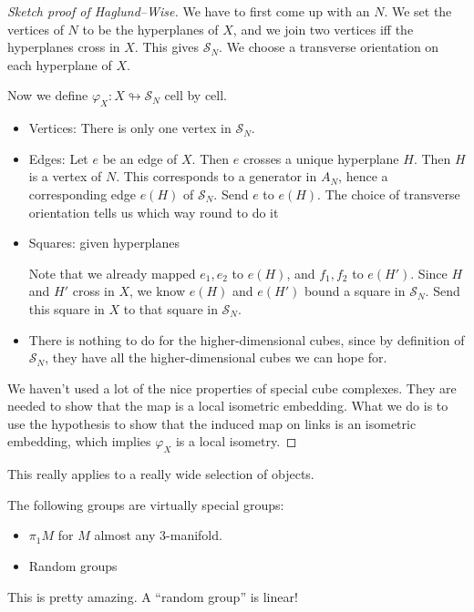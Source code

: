 \documentclass[a4paper]{article}
\begin{document}
\begin{proof}[Sketch proof of Haglund--Wise]
  We have to first come up with an $N$. We set the vertices of $N$ to be the hyperplanes of $X$, and we join two vertices iff the hyperplanes cross in $X$. This gives $\mathcal{S}_N$. We choose a transverse orientation on each hyperplane of $X$.

  Now we define $\varphi_X: X \looparrowright \mathcal{S}_N$ cell by cell.
  \begin{itemize}
    \item Vertices: There is only one vertex in $\mathcal{S}_N$.
    \item Edges: Let $e$ be an edge of $X$. Then $e$ crosses a unique hyperplane $H$. Then $H$ is a vertex of $N$. This corresponds to a generator in $A_N$, hence a corresponding edge $e(H)$ of $\mathcal{S}_N$. Send $e$ to $e(H)$. The choice of transverse orientation tells us which way round to do it
    \item Squares: given hyperplanes
      \begin{center}
      \end{center}
      Note that we already mapped $e_1, e_2$ to $e(H)$, and $f_1, f_2$ to $e(H')$. Since $H$ and $H'$ cross in $X$, we know $e(H)$ and $e(H')$ bound a square in $\mathcal{S}_N$. Send this square in $X$ to that square in $\mathcal{S}_N$.
    \item There is nothing to do for the higher-dimensional cubes, since by definition of $\mathcal{S}_N$, they have all the higher-dimensional cubes we can hope for.
  \end{itemize}
  We haven't used a lot of the nice properties of special cube complexes. They are needed to show that the map is a local isometric embedding. What we do is to use the hypothesis to show that the induced map on links is an isometric embedding, which implies $\varphi_X$ is a local isometry.
\end{proof}

This really applies to a really wide selection of objects.
\begin{eg}
  The following groups are virtually special groups:
  \begin{itemize}
    \item $\pi_1 M$ for $M$ almost any $3$-manifold.
    \item Random groups
  \end{itemize}
\end{eg}
This is pretty amazing. A ``random group'' is linear!
\printindex
\end{document}
